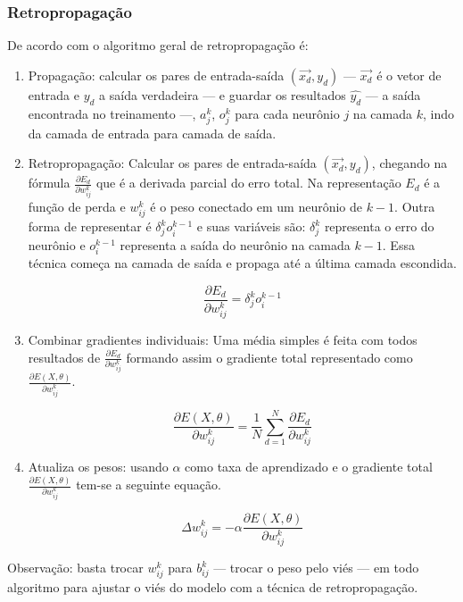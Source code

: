 \subsubsection*{Retropropagação}

De acordo com \space{} o algoritmo geral de retropropagação é:

\begin{enumerate}
    \item Propagação: calcular os pares de entrada-saída $(\overrightarrow{x_d}, y_d)$ — $\overrightarrow{x_d}$ é o vetor de entrada e $y_d$ a saída verdadeira — e guardar os resultados $\hat{y_d}$ — a saída encontrada no treinamento —, $a_j^k$, $o_j^k$ para cada neurônio $j$ na camada $k$, indo da camada de entrada para camada de saída.
    
    \item Retropropagação: Calcular os pares de entrada-saída $(\overrightarrow{x_d}, y_d)$, chegando na fórmula $\frac{\partial{E_d}}{\partial{w_{ij}^k}}$ que é a derivada parcial do erro total. Na representação $E_d$ é a função de perda e $w_{ij}^k$ é o peso  conectado em um neurônio de $k - 1$. Outra forma de representar é $\delta_j^k o_i^{k - 1}$ e suas variáveis são: $\delta_j^k$ representa o erro do neurônio e $o_i^{k - 1}$ representa a saída do neurônio na camada $k -1$. Essa técnica começa na camada de saída e propaga até a última camada escondida.
    
    \begin{equation}
        \frac{\partial{E_d}}{\partial{w_{ij}^k}} = \delta_j^k o_i^{k - 1} 
    \end{equation}
    
    \item Combinar gradientes individuais: Uma média simples é feita com todos resultados de $\frac{\partial{E_d}}{\partial{w_{ij}^k}}$ formando assim o gradiente total representado como $\frac{\partial{E(X, \theta)}}{\partial{w_{ij}^k}}$.
    
    \begin{equation}
        \frac{\partial{E(X,\theta)}}{\partial{w_{ij}^k}} = \frac{1}{N} \sum_{d=1}^{N} \frac{\partial{E_d}}{\partial{w_{ij}^k}}
    \end{equation}
    
    \item Atualiza os pesos: usando $\alpha$ como taxa de aprendizado e o gradiente total $\frac{\partial{E(X, \theta)}}{\partial{w_{ij}^k}}$ tem-se a seguinte equação.
    
    \begin{equation}
        \Delta w_{ij}^k = -\alpha \frac{\partial{E(X,\theta)}}{\partial{w_{ij}^k}}
    \end{equation}
\end{enumerate}

Observação: basta trocar $w_{ij}^k$ para $b_{ij}^k$ — trocar o peso pelo viés — em todo algoritmo para ajustar o viés do modelo com a técnica de retropropagação.
